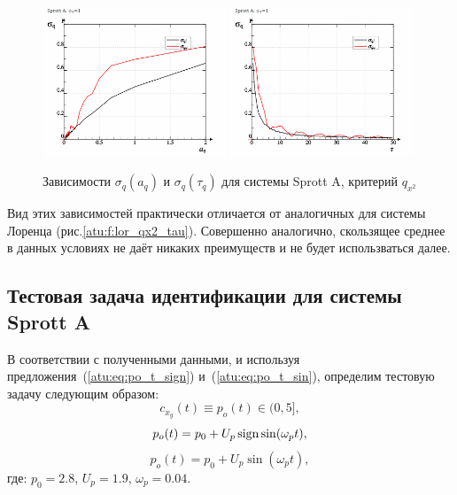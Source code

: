 \begin{figure}[h!]
\begin{center}
  \includegraphics[width=0.49\textwidth]{p/cha/spr_a/sprott_a_qx2_tau-p_aq_sd.png}
  \hfill
  \includegraphics[width=0.49\textwidth]{p/cha/spr_a/sprott_a_qx2_tau-p_tau_sd.png}
\end{center}
  \caption{Зависимости $\sigma_{q}(a_q)$ и $\sigma_{q}(\tau_q)$ для системы Sprott A, критерий  $q_{x^2}$}
\label{atu:f:spr_a_qx2_tau}
\end{figure}

Вид этих зависимостей практически отличается от аналогичных для системы Лоренца (рис.\ref{atu:f:lor_qx2_tau}).
Совершенно аналогично, скользящее среднее в данных условиях
не даёт никаких преимуществ и не будет использваться далее.



\subsection{Тестовая задача идентификации для системы Sprott A}   %

В соответствии с полученными данными, и используя
предложения~(\ref{atu:eq:po_t_sign}) и~(\ref{atu:eq:po_t_sin}),
определим тестовую задачу следующим образом:
\[
  c_{x_y}(t) \equiv p_o(t) \in (0, 5],
\]
%
\begin{equation}
  p_o(t) = p_0 +  U_{p} \operatorname*{sign} \sin( \omega_{p} t ),
  \label{atu:eq:spr_a_po_t_sign}
\end{equation}
%
%
\begin{equation}
  p_o(t) = p_0 +  U_{p} \sin( \omega_{p} t ),
  \label{atu:eq:spr_a_po_t_sin}
\end{equation}
%
где:
$p_0 = 2.8$, $U_p=1.9$, $\omega_p=0.04$.

